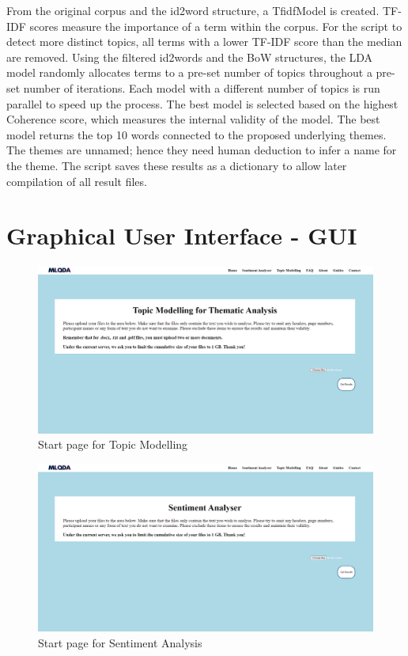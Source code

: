 \documentclass{l4proj}
\begin{document}
\begin{appendices}
From the original corpus and the id2word structure, a TfidfModel is created. TF-IDF scores measure the importance of a term within the corpus. For the script to detect more distinct topics, all terms with a lower TF-IDF score than the median are removed. Using the filtered id2words and the BoW structures, the LDA model randomly allocates terms to a pre-set number of topics throughout a pre-set number of iterations. Each model with a different number of topics is run parallel to speed up the process. The best model is selected based on the highest Coherence score, which measures the internal validity of the model. The best model returns the top 10 words connected to the proposed underlying themes. The themes are unnamed; hence they need human deduction to infer a name for the theme. The script saves these results as a dictionary to allow later compilation of all result files.

\chapter{Graphical User Interface - GUI}
\label{appendix:gui}

\begin{figure}[H]
\centering
    \includegraphics[width=0.95\linewidth]{images/tm_start.png}
    \caption{Start page for Topic Modelling}
    \label{fig:mlqda_tm_start} 
\end{figure}

\begin{figure}[H]
\centering
    \includegraphics[width=0.95\linewidth]{images/sa_start.png}
    \caption{Start page for Sentiment Analysis}
    \label{fig:mlqda_sa_start} 
\end{figure}


\end{appendices}
\end{document}
